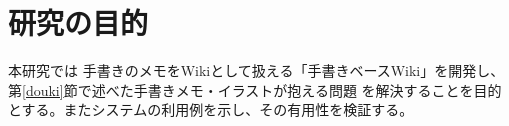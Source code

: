 %

\section{研究の目的}
本研究では 手書きのメモをWikiとして扱える「手書きベースWiki」を開発し、第\ref{douki}節で述べた手書きメモ・イラストが抱える問題
を解決することを目的とする。またシステムの利用例を示し、その有用性を検証する。


